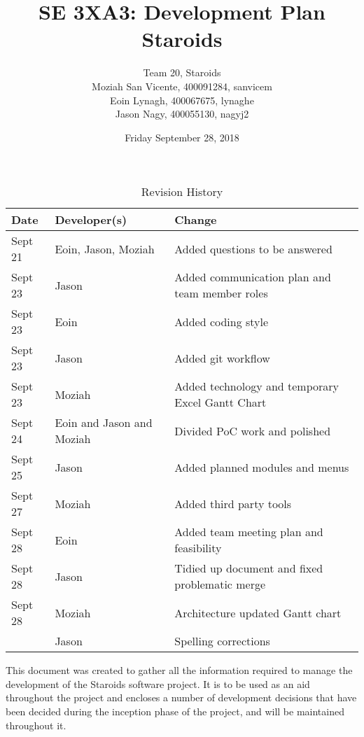 \documentclass{article}
\title{SE 3XA3: Development Plan\\Staroids}
\author{Team 20, Staroids
		\\ Moziah San Vicente, 400091284, sanvicem
		\\ Eoin Lynagh, 400067675, lynaghe
		\\ Jason Nagy, 400055130, nagyj2
}
\date{Friday September 28, 2018}
\begin{document}
\begin{table}[hp]
\caption{Revision History} \label{TblRevisionHistory}
\begin{tabularx}{\textwidth}{llX}
\toprule
\textbf{Date} & \textbf{Developer(s)} & \textbf{Change}\\
\midrule
Sept 21 & Eoin, Jason, Moziah & Added questions to be answered\\
Sept 23 & Jason & Added communication plan and team member roles\\
Sept 23 & Eoin & Added coding style\\
Sept 23 & Jason & Added git workflow\\
Sept 23 & Moziah & Added technology and temporary Excel Gantt Chart\\
Sept 24 & Eoin and Jason and Moziah & Divided PoC work and polished\\
Sept 25 & Jason & Added planned modules and menus\\
Sept 27 & Moziah & Added third party tools\\
Sept 28 & Eoin & Added team meeting plan and feasibility\\
Sept 28 & Jason & Tidied up document and fixed problematic merge\\
Sept 28 & Moziah & Architecture updated Gantt chart\\
\textcolor{red}{Nov 28 & Jason & Spelling corrections}\\
\bottomrule
\end{tabularx}
\end{table}

\newpage

\maketitle

This document was created to gather all the information required to manage the development of the Staroids software project. It is to be used as an aid throughout the project and encloses a number of development decisions that have been decided during the inception phase of the project, and will be maintained throughout it.
\end{document}
